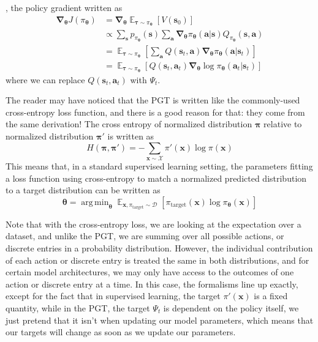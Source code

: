 \documentclass{article}
\DeclareMathOperator*{\argmin}{arg\,min}
\begin{document}
\cite{sutton_barto_rl}, the policy gradient written as\begin{equation}\begin{split}\boldsymbol{\nabla}_{\boldsymbol{\theta}}J(\pi_{\boldsymbol{\theta}})&=\boldsymbol{\nabla}_{\boldsymbol{\theta}}\mathop{\mathbb{E}}_{\boldsymbol{\tau}\sim\pi_{\boldsymbol{\theta}}}[V(\mathbf{s}_0)]\\&\propto\sum_\mathbf{s}p_{\pi_{\boldsymbol{\theta}}}(\mathbf{s})\sum_\mathbf{a}\boldsymbol{\nabla}_{\boldsymbol{\theta}}\pi_{\boldsymbol{\theta}}(\mathbf{a}|\mathbf{s})Q_{\pi_{\boldsymbol{\theta}}}(\mathbf{s},\mathbf{a})\\&=\mathop{\mathbb{E}}_{\boldsymbol{\tau}\sim\pi_{\boldsymbol{\theta}}}\left[\sum_\mathbf{a}Q(\mathbf{s}_t, \mathbf{a})\boldsymbol{\nabla}_{\boldsymbol{\theta}}\pi_{\boldsymbol{\theta}}(\mathbf{a}|\mathbf{s}_t)\right]\\&=\mathop{\mathbb{E}}_{\boldsymbol{\tau}\sim\pi_{\boldsymbol{\theta}}}\left[Q(\mathbf{s}_t, \mathbf{a}_t)\boldsymbol{\nabla}_{\boldsymbol{\theta}}\log\pi_{\boldsymbol{\theta}}(\mathbf{a}_t|\mathbf{s}_t)\right]\end{split}\end{equation}where we can replace $Q(\mathbf{s}_t,\mathbf{a}_t)$ with $\Psi_t$.

The reader may have noticed that the PGT  is written like the commonly-used cross-entropy loss function, and there is a good reason for that: they come from the same derivation! The cross entropy of normalized distribution $\boldsymbol{\pi}$ relative to normalized distribution $\boldsymbol{\pi}'$ is written as \begin{equation}\label{eq:cross-entropy}
H(\boldsymbol{\pi},\boldsymbol{\pi}')=-\sum_{\mathbf{x}\sim\mathcal{X}}\pi'(\mathbf{x})\log\pi(\mathbf{x})
\end{equation} This means that, in a standard supervised learning setting, the parameters fitting a loss function using cross-entropy to match a normalized predicted distribution to a target distribution can be written as 
\begin{equation}
\boldsymbol{\theta}=\argmin_{\boldsymbol{\theta}}\mathop{\mathbb{E}}_{\mathbf{x},\pi_\text{target}\sim\mathcal{D}}\left[\pi_\text{target}(\mathbf{x})\log \pi_{\boldsymbol{\theta}}(\mathbf{x})\right]   
\end{equation}

Note that with the cross-entropy loss, we are looking at the expectation over a dataset, and unlike the PGT, we are summing over all possible actions, or discrete entries in a probability distribution. However, the individual contribution of each action or discrete entry is treated the same in both distributions, and for certain model architectures, we may only have access to the outcomes of one action or discrete entry at a time. In this case, the formalisms line up exactly, except for the fact that in supervised learning, the target $\pi'(\mathbf{x})$ is a fixed quantity, while in the PGT, the target $\Psi_t$ is dependent on the policy itself, we just pretend that it isn't when updating our model parameters, which means that our targets will change as soon as we update our parameters. 
\end{document}
